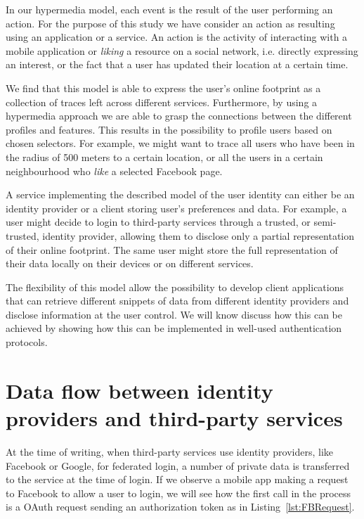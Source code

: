 In our hypermedia model, each event is the result of the user performing an action. For the purpose of this study we have consider an action as resulting using an application or a service. An action is the activity of interacting with a mobile application or \emph{liking} a resource on a social network, i.e. directly expressing an interest, or the fact that a user has updated their location at a certain time.

We find that this model is able to express the user's online footprint as a collection of traces left across different services. Furthermore, by using a hypermedia approach we are able to grasp the connections between the different profiles and features. This results in the possibility to profile users based on chosen selectors. For example, we might want to trace all users who have been in the radius of 500 meters to a certain location, or all the users in a certain neighbourhood who \emph{like} a selected Facebook page.

A service implementing the described model of the user identity can either be an identity provider or a client storing user's preferences and data. For example, a user might decide to login to third-party services through a trusted, or semi-trusted, identity provider, allowing them to disclose only a partial representation of their online footprint. The same user might store the full representation of their data locally on their devices or on different services.

The flexibility of this model allow the possibility to develop client applications that can retrieve different snippets of data from different identity providers and disclose information at the user control. We will know discuss how this can be achieved by showing how this can be implemented in well-used authentication protocols.

\section{Data flow between identity providers and third-party services}

At the time of writing, when third-party services use identity providers, like Facebook or Google, for federated login, a number of private data is transferred to the service at the time of login. If we observe a mobile app making a request to Facebook to allow a user to login, we will see how the first call in the process is a OAuth request sending an authorization token as in Listing~\ref{lst:FBRequest}.

